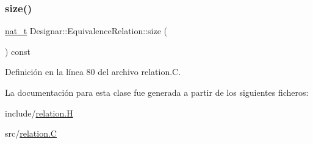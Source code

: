 \subsubsection{\texorpdfstring{size()}{size()}}
{\footnotesize\ttfamily \hyperlink{namespace_designar_aa72662848b9f4815e7bf31a7cf3e33d1}{nat\+\_\+t} Designar\+::\+Equivalence\+Relation\+::size (\begin{DoxyParamCaption}{ }\end{DoxyParamCaption}) const}



Definición en la línea 80 del archivo relation.\+C.



La documentación para esta clase fue generada a partir de los siguientes ficheros\+:\begin{DoxyCompactItemize}
\item 
include/\hyperlink{relation_8_h}{relation.\+H}\item 
src/\hyperlink{relation_8_c}{relation.\+C}\end{DoxyCompactItemize}
